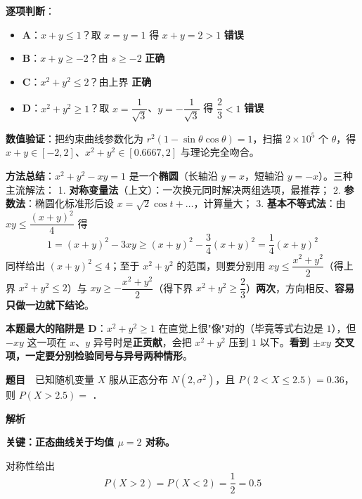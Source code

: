 \textbf{逐项判断}：

\begin{itemize}
\item \textbf{A}：$x+y\le1$？取 $x=y=1$ 得 $x+y=2>1$  \textbf{错误}
\item \textbf{B}：$x+y\ge-2$？由 $s\ge-2$  \textbf{正确}
\item \textbf{C}：$x^{2}+y^{2}\le2$？由上界  \textbf{正确}
\item \textbf{D}：$x^{2}+y^{2}\ge1$？取 $x=\dfrac1{\sqrt3}$、$y=-\dfrac1{\sqrt3}$ 得 $\dfrac23<1$  \textbf{错误}
\end{itemize}

\textbf{数值验证}：把约束曲线参数化为 $r^{2}(1-\sin\theta\cos\theta)=1$，扫描 $2\times10^{5}$ 个 $\theta$，得 $x+y\in[-2,2]$、$x^{2}+y^{2}\in[0.6667,2]$  与理论完全吻合。


\begin{gktip}
\textbf{方法总结}：$x^{2}+y^{2}-xy=1$ 是一个\textbf{椭圆}（长轴沿 $y=x$，短轴沿 $y=-x$）。三种主流解法：
1. \textbf{对称变量法}（上文）：一次换元同时解决两组选项，最推荐；
2. \textbf{参数法}：椭圆化标准形后设 $x=\sqrt2\cos t+\ldots$，计算量大；
3. \textbf{基本不等式法}：由 $xy\le\dfrac{(x+y)^{2}}4$ 得
\[1=(x+y)^{2}-3xy\ge(x+y)^{2}-\frac34(x+y)^{2}=\frac14(x+y)^{2}\]
   同样给出 $(x+y)^{2}\le4$；至于 $x^{2}+y^{2}$ 的范围，则要分别用 $xy\le\dfrac{x^{2}+y^{2}}2$（得上界 $x^{2}+y^{2}\le2$）与 $xy\ge-\dfrac{x^{2}+y^{2}}2$（得下界 $x^{2}+y^{2}\ge\dfrac23$）\textbf{两次}，方向相反、\textbf{容易只做一边就下结论}。

\textbf{本题最大的陷阱是 D}：$x^{2}+y^{2}\ge1$ 在直觉上很"像"对的（毕竟等式右边是 $1$），但 $-xy$ 这一项在 $x$、$y$ 异号时是\textbf{正贡献}，会把 $x^{2}+y^{2}$ 压到 $1$ 以下。\textbf{看到 $\pm xy$ 交叉项，一定要分别检验同号与异号两种情形}。
\end{gktip}

\par\medskip



\textbf{题目}　已知随机变量 $X$ 服从正态分布 $N\left(2,\sigma^{2}\right)$，且 $P(2<X\le2.5)=0.36$，则 $P(X>2.5)=$ \gkblank{}．

\textbf{解析}

\textbf{关键：正态曲线关于均值 $\mu=2$ 对称。}

对称性给出
\[P(X>2)=P(X<2)=\frac12=0.5\]

